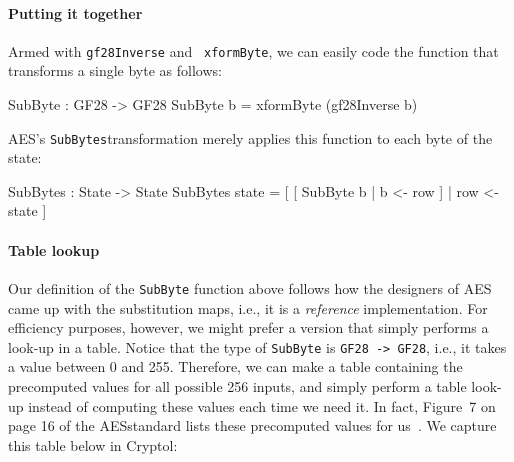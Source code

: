 
\paragraph*{Putting it together} Armed with {\tt gf28Inverse} and {\tt
  xformByte}, we can easily code the function that transforms a single
byte as follows:
\begin{code}
  SubByte : GF28 -> GF28
  SubByte b = xformByte (gf28Inverse b)
\end{code}
AES's {\tt SubBytes}\indAES transformation merely applies this
function to each byte of the state:
\begin{code}
  SubBytes : State -> State
  SubBytes state = [ [ SubByte b | b <- row ] | row <- state ]
\end{code}

\paragraph*{Table lookup} Our definition of the {\tt SubByte} function
above follows how the designers of AES came up with the substitution
maps, i.e., it is a {\em reference} implementation. For efficiency
purposes, however, we might prefer a version that simply performs a
look-up in a table. Notice that the type of {\tt SubByte} is {\tt GF28
  -> GF28}, i.e., it takes a value between 0 and 255. Therefore, we
can make a table containing the precomputed values for all possible
256 inputs, and simply perform a table look-up instead of computing
these values each time we need it.  In fact, Figure~7 on page 16 of
the AES\indAES standard lists these precomputed values for
us~\cite[Section 5.1.1]{aes}. We capture this table below in Cryptol:

